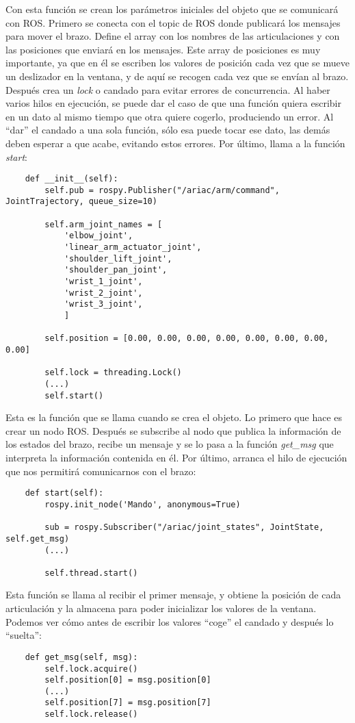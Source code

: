 \begin{itemize}
	Con esta función se crean los parámetros iniciales del objeto que se comunicará con ROS. Primero se conecta con el topic de ROS donde publicará los mensajes para mover el brazo. Define el array con los nombres de las articulaciones y con las posiciones que enviará en los mensajes. Este array de posiciones es muy importante, ya que en él se escriben los valores de posición cada vez que se mueve un deslizador en la ventana, y de aquí se recogen cada vez que se envían al brazo. Después crea un \textit{lock} o candado para evitar errores de concurrencia. Al haber varios hilos en ejecución, se puede dar el caso de que una función quiera escribir en un dato al mismo tiempo que otra quiere cogerlo, produciendo un error. Al “dar” el candado a una sola función, sólo esa puede tocar ese dato, las demás deben esperar a que acabe, evitando estos errores. Por último, llama a la función \textit{start}:
	\begin{lstlisting}
	def __init__(self):
		self.pub = rospy.Publisher("/ariac/arm/command", JointTrajectory, queue_size=10)
		
		self.arm_joint_names = [
			'elbow_joint',
			'linear_arm_actuator_joint',
			'shoulder_lift_joint',
			'shoulder_pan_joint',
			'wrist_1_joint',
			'wrist_2_joint',
			'wrist_3_joint',
			]
			
		self.position = [0.00, 0.00, 0.00, 0.00, 0.00, 0.00, 0.00, 0.00]
		
		self.lock = threading.Lock()
		(...)
		self.start()
	\end{lstlisting}
	
	Esta es la función que se llama cuando se crea el objeto. Lo primero que hace es crear un nodo ROS. Después se subscribe al nodo que publica la información de los estados del brazo, recibe un mensaje y se lo pasa a la función \textit{get\_msg} que interpreta la información contenida en él. Por último, arranca el hilo de ejecución que nos permitirá comunicarnos con el brazo:
	\begin{lstlisting}
	def start(self):
		rospy.init_node('Mando', anonymous=True)

		sub = rospy.Subscriber("/ariac/joint_states", JointState, self.get_msg)
		(...)
	
		self.thread.start()
	\end{lstlisting}
	
	Esta función se llama al recibir el primer mensaje, y obtiene la posición de cada articulación y la almacena para poder inicializar los valores de la ventana. Podemos ver cómo antes de escribir los valores “coge” el candado y después lo “suelta”:
	\begin{lstlisting}
	def get_msg(self, msg):
		self.lock.acquire()
		self.position[0] = msg.position[0]
		(...)
		self.position[7] = msg.position[7]
		self.lock.release()
	\end{lstlisting}
	

\end{itemize}
